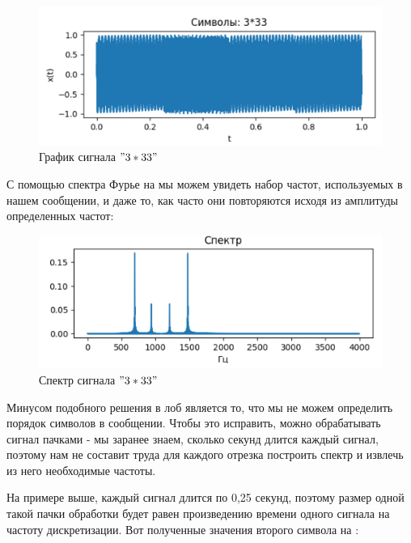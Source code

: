 \begin{figure}[ht] 
	\center
	\includegraphics [scale=0.7] {my_folder/images/step-1}
	\caption{График сигнала $"3*33"$} 
	\label{fig:step-1}
	\end{figure}

С помощью спектра Фурье на  мы можем увидеть набор частот, используемых в нашем сообщении, и даже то, как часто они повторяются исходя из амплитуды определенных частот: 

\begin{figure}[ht] 
	\center
	\includegraphics [scale=0.7] {my_folder/images/step-2}
	\caption{Спектр сигнала $"3*33"$} 
	\label{fig:step-2}
	\end{figure}
	
Минусом подобного решения в лоб является то, что мы не можем определить порядок символов в сообщении. Чтобы это исправить, можно обрабатывать сигнал пачками - мы заранее знаем, сколько секунд длится каждый сигнал, поэтому нам не составит труда для каждого отрезка построить спектр и извлечь из него необходимые частоты.

На примере выше, каждый сигнал длится по 0,25 секунд, поэтому размер одной такой пачки обработки будет равен произведению времени одного сигнала на частоту дискретизации. Вот полученные значения второго символа на :


